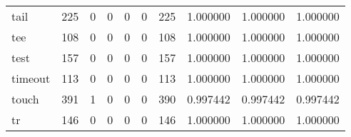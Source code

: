 \begin{longtable}{lrrrrrrrrr}
tail      &                                                225 &                                                  0 &                                                  0 &                                                  0 &                                                  0 &                                                225 &                                           1.000000 &                               1.000000 &                             1.000000 \\
tee       &                                                108 &                                                  0 &                                                  0 &                                                  0 &                                                  0 &                                                108 &                                           1.000000 &                               1.000000 &                             1.000000 \\
test      &                                                157 &                                                  0 &                                                  0 &                                                  0 &                                                  0 &                                                157 &                                           1.000000 &                               1.000000 &                             1.000000 \\
timeout   &                                                113 &                                                  0 &                                                  0 &                                                  0 &                                                  0 &                                                113 &                                           1.000000 &                               1.000000 &                             1.000000 \\
touch     &                                                391 &                                                  1 &                                                  0 &                                                  0 &                                                  0 &                                                390 &                                           0.997442 &                               0.997442 &                             0.997442 \\
tr        &                                                146 &                                                  0 &                                                  0 &                                                  0 &                                                  0 &                                                146 &                                           1.000000 &                               1.000000 &                             1.000000 \\

\end{longtable}
